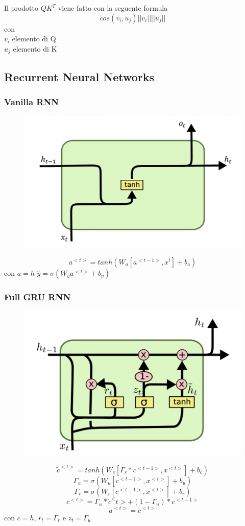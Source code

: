\documentclass[]{article}
\begin{document}
Il prodotto $QK^T$ viene fatto con la seguente formula\\
\[ cos(v_i, u_j)||v_i|| ||u_j|| \]
con \\
$v_i$ elemento di Q \\
$u_j$ elemento di K

\subsection{Recurrent Neural Networks}
\subsubsection{Vanilla RNN}
\begin{figure}[h] 
\centering 
\includegraphics[scale=0.4]{vanilla} 
\end{figure} 
\[ a^{<t>} = tanh(W_a[a^{<t-1>}, x^{t}]+b_a) \]
con $a = h$ $\hat{y} = \sigma(W_ya^{<t>} +b_y)$\\

\subsubsection{Full GRU RNN}
\begin{figure}[h] 
\centering 
\includegraphics[scale=0.4]{gru} 
\end{figure} 
\[ \tilde{c}^{<t>} = tanh(W_c[\Gamma_r *{c}^{<t-1>}, {x}^{<t>}] +b_c) \]
\[ \Gamma_u   = \sigma(W_u[{c}^{<t-1>}, {x}^{<t>}] + b_u) \]
\[ \Gamma_r   = \sigma(W_r[{c}^{<t-1>}, {x}^{<t>}] + b_r) \]
\[ c^{<t>} = \Gamma_u * \tilde{c}^<t> + (1-\Gamma_u)*c^{<t-1>} \]
\[a^{<t>} = c^{<t>} \]
con $c = h$, $r_t = \Gamma_r$ e $z_t = \Gamma_u$ 
\end{document}
